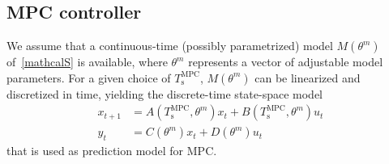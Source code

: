 \documentclass{article}
\newcommand{\TMPC}{T_{\mathrm{s}}^{\mathrm{MPC}}}
\begin{document}
\subsection{MPC controller} \label{Sec:outerMPC}
We assume that a continuous-time (possibly parametrized) model $M(\theta^m)$ of~\eqref{mathcalS} is available, where $\theta^m$ represents a vector of adjustable model parameters.
For a given choice of $\TMPC$, $M(\theta^m)$ can be linearized and discretized in time, yielding the discrete-time state-space model 
\begin{subequations}  
\label{eq:SITO}
\begin{align}
x_{t+1}&=A(\TMPC,\theta^m)x_t+B(\TMPC,\theta^m)u_t \label{eq:MPCsysstate}\\
    y_t&=C(\theta^m)x_t+D(\theta^m)u_t \label{eq:MPCsysout}
\end{align}
\end{subequations}
that is used as prediction model for MPC.
\end{document}
